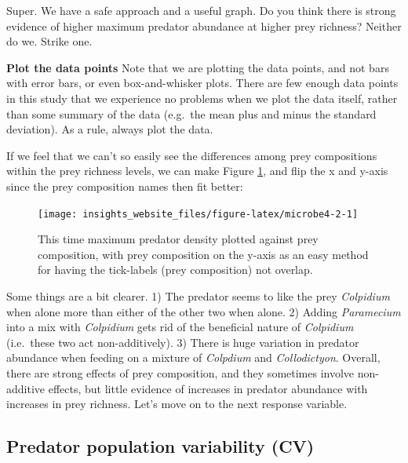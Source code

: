 \documentclass[]{book}
\begin{document}
Super. We have a safe approach and a useful graph. Do you think there is strong evidence of higher maximum predator abundance at higher prey richness? Neither do we. Strike one.

\begin{reliability}
\textbf{Plot the data points} Note that we are plotting the data points,
and not bars with error bars, or even box-and-whisker plots. There are
few enough data points in this study that we experience no problems when
we plot the data itself, rather than some summary of the data (e.g.~the
mean plus and minus the standard deviation). As a rule, always plot the
data.
\end{reliability}

If we feel that we can't so easily see the differences among prey compositions within the prey richness levels, we can make Figure \ref{fig:microbe4-2}, and flip the x and y-axis since the prey composition names then fit better:

\begin{figure}

{\centering \texttt{[image: insights\_website\_files/figure-latex/microbe4-2-1]} 

}

\caption{This time maximum predator density plotted against prey composition, with prey composition on the y-axis as an easy method for having the tick-labels (prey composition) not overlap.}\label{fig:microbe4-2}
\end{figure}

Some things are a bit clearer. 1) The predator seems to like the prey \emph{Colpidium} when alone more than either of the other two when alone. 2) Adding \emph{Paramecium} into a mix with \emph{Colpidium} gets rid of the beneficial nature of \emph{Colpidium} (i.e.~these two act non-additively). 3) There is huge variation in predator abundance when feeding on a mixture of \emph{Colpdium} and \emph{Collodictyon}. Overall, there are strong effects of prey composition, and they sometimes involve non-additive effects, but little evidence of increases in predator abundance with increases in prey richness. Let's move on to the next response variable.

\hypertarget{predator-population-variability-cv}{%
\subsection{Predator population variability (CV)}\label{predator-population-variability-cv}}
\end{document}
